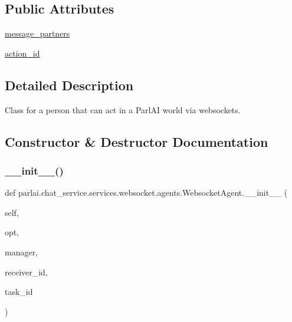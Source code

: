 \subsection*{Public Attributes}
\begin{DoxyCompactItemize}
\item 
\hyperlink{classparlai_1_1chat__service_1_1services_1_1websocket_1_1agents_1_1WebsocketAgent_acdde68c9a11ff8d7cbc968d26f166061}{message\+\_\+partners}
\item 
\hyperlink{classparlai_1_1chat__service_1_1services_1_1websocket_1_1agents_1_1WebsocketAgent_a013ba8209bd78bec4b657f422371d81e}{action\+\_\+id}
\end{DoxyCompactItemize}


\subsection{Detailed Description}
\begin{DoxyVerb}Class for a person that can act in a ParlAI world via websockets.
\end{DoxyVerb}
 

\subsection{Constructor \& Destructor Documentation}
\mbox{\label{classparlai_1_1chat__service_1_1services_1_1websocket_1_1agents_1_1WebsocketAgent_a128d5ee9aaa2861274d95778b75dda16}} 
\subsubsection{\texorpdfstring{\+\_\+\+\_\+init\+\_\+\+\_\+()}{\_\_init\_\_()}}
{\footnotesize\ttfamily def parlai.\+chat\+\_\+service.\+services.\+websocket.\+agents.\+Websocket\+Agent.\+\_\+\+\_\+init\+\_\+\+\_\+ (\begin{DoxyParamCaption}\item[{}]{self,  }\item[{}]{opt,  }\item[{}]{manager,  }\item[{}]{receiver\+\_\+id,  }\item[{}]{task\+\_\+id }\end{DoxyParamCaption})}



